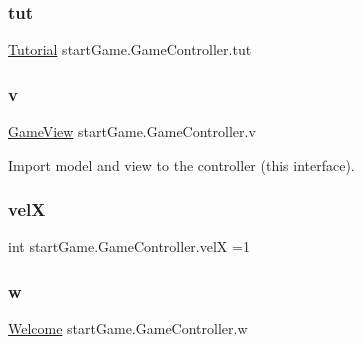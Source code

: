 \subsubsection{\texorpdfstring{tut}{tut}}
{\footnotesize\ttfamily \hyperlink{classview_1_1_tutorial}{Tutorial} start\+Game.\+Game\+Controller.\+tut\hspace{0.3cm}{\ttfamily [private]}}

\hypertarget{classstart_game_1_1_game_controller_a86e3c6ba6e8d0ecb0946da48fa55e7ee}{}\label{classstart_game_1_1_game_controller_a86e3c6ba6e8d0ecb0946da48fa55e7ee} 
\subsubsection{\texorpdfstring{v}{v}}
{\footnotesize\ttfamily \hyperlink{classview_1_1_game_view}{Game\+View} start\+Game.\+Game\+Controller.\+v\hspace{0.3cm}{\ttfamily [private]}}

Import model and view to the controller (this interface). \hypertarget{classstart_game_1_1_game_controller_a9de0dcbec624980f8b3808daa96ef457}{}\label{classstart_game_1_1_game_controller_a9de0dcbec624980f8b3808daa96ef457} 
\subsubsection{\texorpdfstring{velX}{velX}}
{\footnotesize\ttfamily int start\+Game.\+Game\+Controller.\+velX =1\hspace{0.3cm}{\ttfamily [private]}}

\hypertarget{classstart_game_1_1_game_controller_a5478c83b51a049015f9d4d6bc5c61607}{}\label{classstart_game_1_1_game_controller_a5478c83b51a049015f9d4d6bc5c61607} 
\subsubsection{\texorpdfstring{w}{w}}
{\footnotesize\ttfamily \hyperlink{classview_1_1_welcome}{Welcome} start\+Game.\+Game\+Controller.\+w\hspace{0.3cm}{\ttfamily [private]}}

